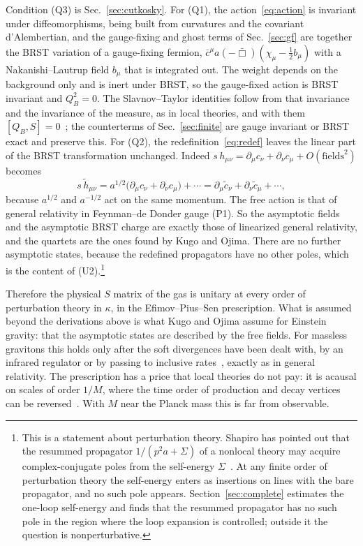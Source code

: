\documentclass[aps,prd,10pt,twocolumn,superscriptaddress,nofootinbib,floatfix,longbibliography]{revtex4-2}
\begin{document}
Condition (Q3) is Sec.~\ref{sec:cutkosky}. For (Q1), the action~\eqref{eq:action} is invariant under diffeomorphisms, being built from curvatures and the covariant d'Alembertian, and the gauge-fixing and ghost terms of Sec.~\ref{sec:gf} are together the BRST variation of a gauge-fixing fermion, $\bar c^\mu a(-\bar\Box)(\chi_\mu-\frac12 b_\mu)$ with a Nakanishi--Lautrup field $b_\mu$ that is integrated out. The weight depends on the background only and is inert under BRST, so the gauge-fixed action is BRST invariant and $Q_B^2=0$. The Slavnov--Taylor identities follow from that invariance and the invariance of the measure, as in local theories, and with them $[Q_B,S]=0$~\cite{KugoOjima1978}; the counterterms of Sec.~\ref{sec:finite} are gauge invariant or BRST exact and preserve this. For (Q2), the redefinition~\eqref{eq:redef} leaves the linear part of the BRST transformation unchanged. Indeed $s\,h_{\mu\nu}=\partial_\mu c_\nu+\partial_\nu c_\mu+O(\text{fields}^2)$ becomes
\[
s\,\tilde h_{\mu\nu}=a^{1/2}\bigl(\partial_\mu c_\nu+\partial_\nu c_\mu\bigr)+\cdots=\partial_\mu\tilde c_\nu+\partial_\nu\tilde c_\mu+\cdots,
\]
because $a^{1/2}$ and $a^{-1/2}$ act on the same momentum. The free action is that of general relativity in Feynman--de Donder gauge (P1). So the asymptotic fields and the asymptotic BRST charge are exactly those of linearized general relativity, and the quartets are the ones found by Kugo and Ojima. There are no further asymptotic states, because the redefined propagators have no other poles, which is the content of (U2).\footnote{This is a statement about perturbation theory. Shapiro has pointed out that the resummed propagator $1/(p^2a+\Sigma)$ of a nonlocal theory may acquire complex-conjugate poles from the self-energy $\Sigma$~\cite{Shapiro2015}. At any finite order of perturbation theory the self-energy enters as insertions on lines with the bare propagator, and no such pole appears. Section~\ref{sec:complete} estimates the one-loop self-energy and finds that the resummed propagator has no such pole in the region where the loop expansion is controlled; outside it the question is nonperturbative.}

Therefore the physical $S$ matrix of the gas is unitary at every order of perturbation theory in $\kappa$, in the Efimov--Pius--Sen prescription. What is assumed beyond the derivations above is what Kugo and Ojima assume for Einstein gravity: that the asymptotic states are described by the free fields. For massless gravitons this holds only after the soft divergences have been dealt with, by an infrared regulator or by passing to inclusive rates~\cite{Weinberg1965}, exactly as in general relativity. The prescription has a price that local theories do not pay: it is acausal on scales of order $1/M$, where the time order of production and decay vertices can be reversed~\cite{Carone2017}. With $M$ near the Planck mass this is far from observable.
\end{document}
